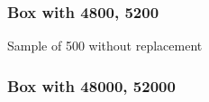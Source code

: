 \documentclass[handout]{beamer}
\begin{document}


   \begin{frame}
   \frametitle{Box with {\color{red} 4800}, {\color{blue} 5200}}
   \begin{center}
   \end{center}
   Sample of 500 without replacement
   \end{frame}



   \begin{frame}
   \frametitle{Box with {\color{red} 48000}, {\color{blue} 52000}}
   \begin{center}
   \end{center}

   \end{frame}
\end{document}
